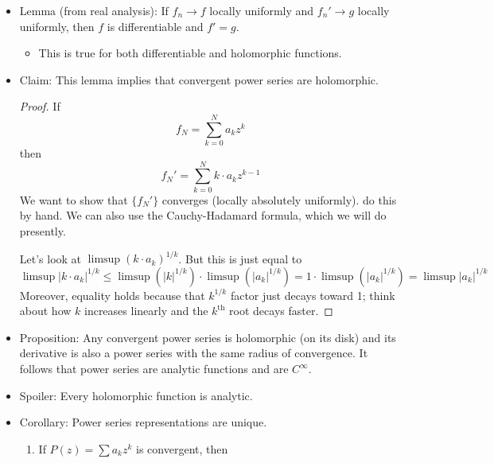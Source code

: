 \documentclass[../notes.tex]{subfiles}
\begin{document}
\begin{itemize}
\begin{itemize}
    \end{itemize}
    \item Lemma (from real analysis): If $f_n\to f$ locally uniformly and $f_n'\to g$ locally uniformly, then $f$ is differentiable and $f'=g$.
    \begin{itemize}
        \item This is true for both differentiable and holomorphic functions.
    \end{itemize}
    \item Claim: This lemma implies that convergent power series are holomorphic.
    \begin{proof}
        If
        \begin{equation*}
            f_N = \sum_{k=0}^Na_kz^k
        \end{equation*}
        then
        \begin{equation*}
            f_N' = \sum_{k=0}^Nk\cdot a_kz^{k-1}
        \end{equation*}
        We want to show that $\{f_N'\}$ converges (locally absolutely uniformly). \textcite{bib:FischerLieb} do this by hand. We can also use the Cauchy-Hadamard formula, which we will do presently.\par
        Let's look at $\limsup(k\cdot a_k)^{1/k}$. But this is just equal to
        \begin{equation*}
            \limsup|k\cdot a_k|^{1/k} %
            \leq \limsup(|k|^{1/k})\cdot\limsup(|a_k|^{1/k})
            = 1\cdot\limsup(|a_k|^{1/k})
            = \limsup|a_k|^{1/k}
        \end{equation*}
        Moreover, equality holds because that $k^{1/k}$ factor just decays toward 1; think about how $k$ increases linearly and the $k^\text{th}$ root decays faster.
    \end{proof}
    \item Proposition: Any convergent power series is holomorphic (on its disk) and its derivative is also a power series with the same radius of convergence. It follows that power series are analytic functions and are $C^\infty$.
    \item Spoiler: Every holomorphic function is analytic.
    \item Corollary: Power series representations are unique.
    \begin{enumerate}
        \item If $P(z)=\sum a_kz^k$ is convergent, then
        \begin{equation*}

\end{equation*}
\end{enumerate}
\end{itemize}
\end{document}
